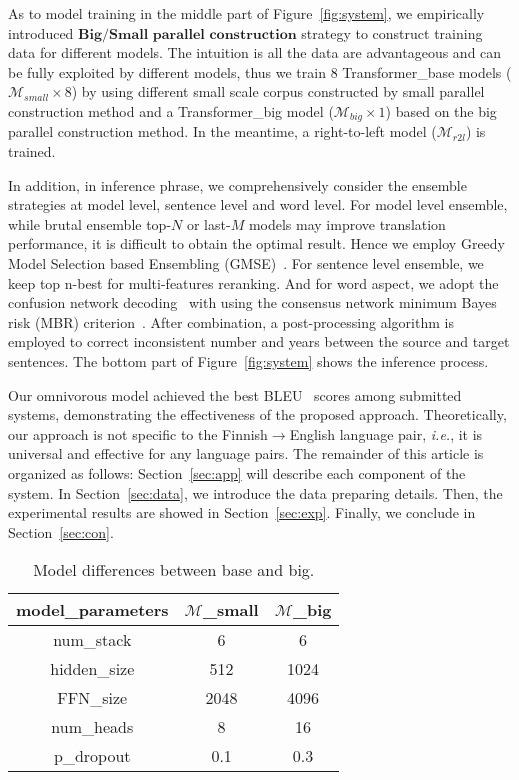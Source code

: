 \documentclass[11pt,a4paper]{article}
\begin{document}
  As to model training in the middle part of Figure~\ref{fig:system}, we empirically introduced $\textbf{Big/Small parallel construction}$ strategy to construct training data for different models. The intuition is all the data are advantageous and can be fully exploited by different models, thus we train $8$ Transformer\_base models ($\mathcal{M}_{small}\times8$) by using different small scale corpus constructed by small parallel construction method and a Transformer\_big model ($\mathcal{M}_{big}\times1$) based on the big parallel construction method. In the meantime, a right-to-left model ($\mathcal{M}_{r2l}$) is trained.
  
  In addition, in inference phrase, we comprehensively consider the ensemble strategies at model level, sentence level and word level. For model level ensemble, while brutal ensemble top-$N$ or last-$M$ models may improve translation performance, it is difficult to obtain the optimal result. Hence we employ Greedy Model Selection based Ensembling (GMSE)~\cite{partalas2008focused,deng-etal-2018-alibabas}. For sentence level ensemble, we keep top n-best for multi-features reranking. And for word aspect, we adopt the confusion network decoding~\cite{bangalore2001computing,matusov2006computing,sim2007consensus} with using the consensus network minimum Bayes risk (MBR) criterion~\cite{sim2007consensus}. After combination, a post-processing algorithm is employed to correct inconsistent number and years between the source and target sentences. The bottom part of Figure~\ref{fig:system} shows the inference process.
  
  Our omnivorous model achieved the best BLEU~\cite{papineni2002bleu} scores among submitted systems, demonstrating the effectiveness of the proposed approach. Theoretically, our approach is not specific to the Finnish$\rightarrow$English language pair, \textit{i.e.}, it is universal and effective for any language pairs. The remainder of this article is organized as follows: Section~\ref{sec:app} will describe each component of the system. In Section~\ref{sec:data}, we introduce the data preparing details. Then, the experimental results are showed in Section~\ref{sec:exp}. Finally, we conclude in Section~\ref{sec:con}.
  

\begin{table}[t!]
    \begin{center}
    \begin{tabular}{c|c|c}
    \hline 
    model\_parameters & $\mathcal{M}$\_{small} & $\mathcal{M}$\_{big} \\
    \hline
    num\_stack & 6 & 6\\ 
    \hline
    hidden\_size & 512 & 1024\\
    \hline
    FFN\_size & 2048 & 4096\\
    \hline
    num\_heads & 8 & 16\\
    \hline
    p\_dropout & 0.1 & 0.3\\
    \hline
    \end{tabular}
    \end{center}
    \caption{\label{tab:models}Model differences between base and big.}
\end{table}
\end{document}
